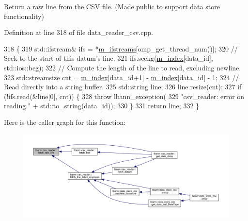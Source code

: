Return a raw line from the C\+SV file. (Made public to support data store functionality) 

Definition at line 318 of file data\+\_\+reader\+\_\+csv.\+cpp.


\begin{DoxyCode}
318                                                 \{
319   std::ifstream& ifs = *\hyperlink{classlbann_1_1csv__reader_a41ede08dd2ed420bf8f6c6670d892caf}{m\_ifstreams}[omp\_get\_thread\_num()];
320   \textcolor{comment}{// Seek to the start of this datum's line.}
321   ifs.seekg(\hyperlink{classlbann_1_1csv__reader_a2a959e7839d2d11e2deba98ba1884006}{m\_index}[data\_id], std::ios::beg);
322   \textcolor{comment}{// Compute the length of the line to read, excluding newline.}
323   std::streamsize cnt = \hyperlink{classlbann_1_1csv__reader_a2a959e7839d2d11e2deba98ba1884006}{m\_index}[data\_id+1] - \hyperlink{classlbann_1_1csv__reader_a2a959e7839d2d11e2deba98ba1884006}{m\_index}[data\_id] - 1;
324   \textcolor{comment}{// Read directly into a string buffer.}
325   std::string line;
326   line.resize(cnt);
327   \textcolor{keywordflow}{if} (!ifs.read(&line[0], cnt)) \{
328     \textcolor{keywordflow}{throw} lbann\_exception(
329       \textcolor{stringliteral}{"csv\_reader: error on reading "} + std::to\_string(data\_id));
330   \}
331   \textcolor{keywordflow}{return} line;
332 \}
\end{DoxyCode}
Here is the caller graph for this function\+:\nopagebreak
\begin{figure}[H]
\begin{center}
\leavevmode
\includegraphics[width=350pt]{classlbann_1_1csv__reader_a8ea8669ec6c85de8d4127da7bb47d135_icgraph}
\end{center}
\end{figure}
\mbox{\label{classlbann_1_1csv__reader_ab4bbc1b0a9982595b89a930cc125b40b}} 
